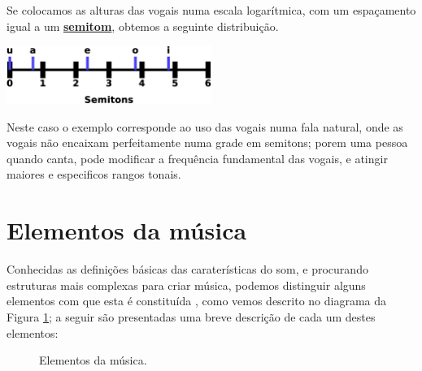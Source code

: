 \begin{elaboracion}[title=Timbre das vogais]
Se colocamos as alturas das vogais numa escala logarítmica, com um espaçamento igual a um
\hyperref[sec:pos:Semitom]{\textbf{semitom}},
obtemos a seguinte distribuição.
\begin{center}
\includegraphics[width=0.5\textwidth]{chapters/cap-musica-basica/vocales-semitons2a.eps}
\end{center}
Neste caso o exemplo corresponde ao uso das vogais numa fala natural, 
onde as vogais não encaixam perfeitamente numa grade em semitons;
porem uma pessoa quando canta, pode modificar a frequência fundamental das vogais,
e atingir maiores e especificos rangos tonais. 
\label{fig:timbresvocais}
\end{elaboracion}


\section{Elementos da música}
\label{sec:elementosmusica}
Conhecidas as definições básicas das caraterísticas do som, 
e procurando estruturas mais complexas para criar música,
podemos distinguir alguns elementos com que esta é constituída \cite[pp. 11]{alves2004teoria},
como vemos descrito no diagrama da Figura  \ref{fig:elementos:musica};
a seguir são presentadas uma breve descrição de cada um destes elementos:

\begin{figure}[!ht]
\centering
{} 
\caption{Elementos da música.}
\label{fig:elementos:musica}
\end{figure}

